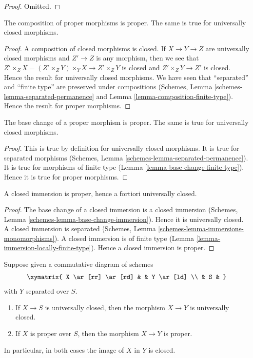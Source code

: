 \begin{proof}
Omitted.
\end{proof}

\begin{lemma}
\label{lemma-composition-proper}
The composition of proper morphisms is proper.
The same is true for universally closed morphisms.
\end{lemma}

\begin{proof}
A composition of closed morphisms is closed.
If $X \to Y \to Z$ are universally closed morphisms
and $Z' \to Z$ is any morphism, then we see that
$Z' \times_Z X = (Z' \times_Z Y) \times_Y X  \to Z' \times_Z Y$
is closed and $Z' \times_Z Y \to Z'$ is closed.
Hence the result for universally closed morphisms.
We have seen that ``separated'' and ``finite type''
are preserved under compositions
(Schemes, Lemma \ref{schemes-lemma-separated-permanence} and
Lemma \ref{lemma-composition-finite-type}). Hence the
result for proper morphisms.
\end{proof}

\begin{lemma}
\label{lemma-base-change-proper}
The base change of a proper morphism is proper.
The same is true for universally closed morphisms.
\end{lemma}

\begin{proof}
This is true by definition for universally closed morphisms.
It is true for separated morphisms
(Schemes, Lemma \ref{schemes-lemma-separated-permanence}).
It is true for morphisms of finite type
(Lemma \ref{lemma-base-change-finite-type}).
Hence it is true for proper morphisms.
\end{proof}

\begin{lemma}
\label{lemma-closed-immersion-proper}
A closed immersion is proper, hence a fortiori universally closed.
\end{lemma}

\begin{proof}
The base change of a closed immersion is a closed immersion
(Schemes, Lemma \ref{schemes-lemma-base-change-immersion}).
Hence it is universally closed.
A closed immersion is separated
(Schemes, Lemma \ref{schemes-lemma-immersions-monomorphisms}).
A closed immersion is of finite type
(Lemma \ref{lemma-immersion-locally-finite-type}).
Hence a closed immersion is proper.
\end{proof}

\begin{lemma}
\label{lemma-image-proper-scheme-closed}
Suppose given a commutative diagram of schemes
$$
\xymatrix{
X \ar[rr] \ar[rd] & &
Y \ar[ld] \\
& S &
}
$$
with $Y$ separated over $S$.
\begin{enumerate}
\item If $X \to S$ is universally closed, then the morphism
$X \to Y$ is universally closed.
\item If $X$ is proper over $S$, then the morphism $X \to Y$ is proper.
\end{enumerate}
In particular, in both cases the image of $X$ in $Y$ is closed.
\end{lemma}

